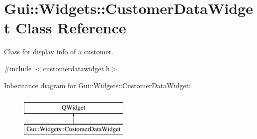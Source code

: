 \hypertarget{classGui_1_1Widgets_1_1CustomerDataWidget}{}\section{Gui\+:\+:Widgets\+:\+:Customer\+Data\+Widget Class Reference}
\label{classGui_1_1Widgets_1_1CustomerDataWidget}


Class for display info of a customer.  




{\ttfamily \#include $<$customerdatawidget.\+h$>$}

Inheritance diagram for Gui\+:\+:Widgets\+:\+:Customer\+Data\+Widget\+:\begin{figure}[H]
\begin{center}
\leavevmode
\includegraphics[height=2.000000cm]{df/deb/classGui_1_1Widgets_1_1CustomerDataWidget}
\end{center}
\end{figure}
